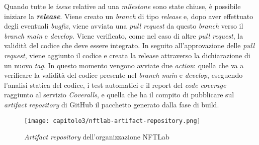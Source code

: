 Quando tutte le \textit{issue} relative ad una \textit{milestone} sono state chiuse, è possibile iniziare la \textbf{\textit{release}}. Viene creato un \textit{branch} di tipo \textit{release} e, dopo aver effettuato degli eventuali \textit{bugfix}, viene avviata una \textit{pull request} da questo \textit{branch} verso il \textit{branch main} e \textit{develop}. Viene verificato, come nel caso di altre \textit{pull request}, la validità del codice che deve essere integrato. In seguito all'approvazione delle \textit{pull request}, viene aggiunto il codice e creata la release attraverso la dichiarazione di un nuovo \textit{tag}. In questo momento vengono avviate due \textit{action}: quella che va a verificare la validità del codice presente nel \textit{branch main} e \textit{develop}, eseguendo l'analisi statica del codice, i test automatici e il report del \textit{code coverage} raggiunto al servizio \textit{Coveralls}, e quella che ha il compito di pubblicare sul \textit{artifact repository} di GitHub il pacchetto generato dalla fase di build.

\begin{figure}[h!]
  \centering
  \texttt{[image: capitolo3/nftlab-artifact-repository.png]}
  \caption{\textit{Artifact repository} dell'organizzazione NFTLab}
\end{figure}
